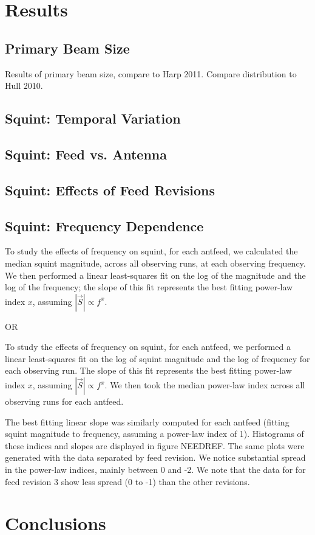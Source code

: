 \documentclass[preprint]{aastex}
\begin{document}
\section{Results}\label{s.results}

\subsection{Primary Beam Size}\label{ss.beamsize}
Results of primary beam size, compare to Harp 2011\cite{Harp2011}.
Compare distribution to Hull 2010\cite{Hull2010}.

\subsection{Squint: Temporal Variation}\label{ss.temporal}

\subsection{Squint: Feed vs. Antenna}\label{ss.antfeed}

\subsection{Squint: Effects of Feed Revisions}\label{ss.revisions}

\subsection{Squint: Frequency Dependence}\label{ss.freq}
To study the effects of frequency on squint, for each antfeed, we
calculated the median squint magnitude, across all observing runs, at
each observing frequency.  We then performed a linear least-squares
fit on the log of the magnitude and the log of the frequency; the
slope of this fit represents the best fitting power-law index $x$,
assuming $|\vec{S}| \propto f^x$.

OR

To study the effects of frequency on squint, for each antfeed, we
performed a linear least-squares fit on the log of squint magnitude
and the log of frequency for each observing run.  The slope of this
fit represents the best fitting power-law index $x$, assuming
$|\vec{S}| \propto f^x$.  We then took the median power-law index
across all observing runs for each antfeed.

The best fitting linear slope was similarly computed for each antfeed
(fitting squint magnitude to frequency, assuming a power-law index of
1).  Histograms of these indices and slopes are displayed in figure
NEEDREF.  The same plots were generated with the data separated by
feed revision.  We notice substantial spread in the power-law indices,
mainly between 0 and -2.  We note that the data for for feed revision
3 show less spread (0 to -1) than the other revisions.

\section{Conclusions}\label{s.conclusions}



\end{document}
